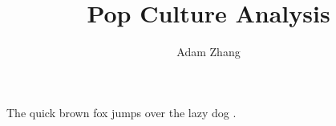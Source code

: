 \documentclass[mla8]{mla}
\title{Pop Culture Analysis}
\author{Adam Zhang}
\date{\mladate}
\begin{document}
\begin{paper}
  The quick brown fox jumps over the lazy dog \autocite{Shusterman2017:Scythe}.
\end{paper}

\begin{workscited}
  \printbibliography[heading=none]
\end{workscited}
\end{document}

